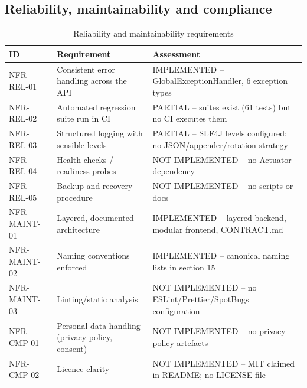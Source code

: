 \subsection{Reliability, maintainability and compliance}
\begin{table}[H]
\centering
\caption{Reliability and maintainability requirements}
\label{tab:nfr-reliability}
\begin{tabular}{@{}C{1.4cm}L{8.8cm}L{3.8cm}@{}}
\toprule
\textbf{ID} & \textbf{Requirement} & \textbf{Assessment} \\
\midrule
NFR-REL-01 & Consistent error handling across the API & IMPLEMENTED -- GlobalExceptionHandler, 6 exception types \\
NFR-REL-02 & Automated regression suite run in CI & PARTIAL -- suites exist (61 tests) but no CI executes them \\
NFR-REL-03 & Structured logging with sensible levels & PARTIAL -- SLF4J levels configured; no JSON/appender/rotation strategy \\
NFR-REL-04 & Health checks / readiness probes & NOT IMPLEMENTED -- no Actuator dependency \\
NFR-REL-05 & Backup and recovery procedure & NOT IMPLEMENTED -- no scripts or docs \\
NFR-MAINT-01 & Layered, documented architecture & IMPLEMENTED -- layered backend, modular frontend, CONTRACT.md \\
NFR-MAINT-02 & Naming conventions enforced & IMPLEMENTED -- canonical naming lists in  section 15 \\
NFR-MAINT-03 & Linting/static analysis & NOT IMPLEMENTED -- no ESLint/Prettier/SpotBugs configuration \\
NFR-CMP-01 & Personal-data handling (privacy policy, consent) & NOT IMPLEMENTED -- no privacy policy artefacts \\
NFR-CMP-02 & Licence clarity & NOT IMPLEMENTED -- MIT claimed in README; no LICENSE file \\
\bottomrule
\end{tabular}
\end{table}

